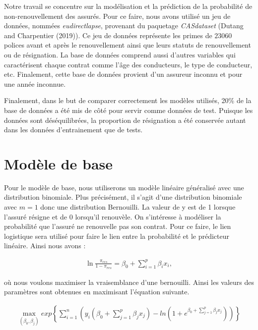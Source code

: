 \documentclass[]{article}
\begin{document}
Notre travail se concentre sur la modélisation et la prédiction de la
probabilité de non-renouvellement des assurés. Pour ce faire, nous avons
utilisé un jeu de données, nommées \emph{eudirectlapse}, provenant du
paquetage \emph{CASdataset} (Dutang and Charpentier (2019)). Ce jeu de
données représente les primes de \(23 060\) polices avant et après le
renouvellement ainsi que leurs statuts de renouvellement ou de
résignation. La base de données comprend aussi d'autres variables qui
caractérisent chaque contrat comme l'âge des conducteurs, le type de
conducteur, etc. Finalement, cette base de données provient d'un
assureur inconnu et pour une année inconnue.

Finalement, dans le but de comparer correctement les modèles utilisés,
20\% de la base de données a été mis de côté pour servir comme données
de test. Puisque les données sont déséquilibrées, la proportion de
résignation a été conservée autant dans les données d'entrainement que
de tests.

\newpage

\section{Modèle de base}\label{moduxe8le-de-base}

Pour le modèle de base, nous utiliserons un modèle linéaire généralisé
avec une distribution binomiale. Plus précisément, il s'agit d'une
distribution binomiale avec \(m = 1\) donc une distribution Bernouilli.
La valeur de y est de 1 lorsque l'assuré résigne et de 0 lorsqu'il
renouvèle. On s'intéresse à modéliser la probabilité que l'assuré ne
renouvelle pas son contrat. Pour ce faire, le lien logistique sera
utilisé pour faire le lien entre la probabilité et le prédicteur
linéaire. Ainsi nous avons :

\begin{align}
    \ln \frac{\pi_{res}}{1 - \pi_{res}} = \beta_0 + \sum_{i=1}^p \beta_i x_i,
\end{align}

où nous voulons maximiser la vraisemblance d'une bernouilli. Ainsi les
valeurs des paramètres sont obtenues en maximisant l'équation suivante.

\begin{align}
    \max\limits_{(\beta_0, \beta_j)} exp\left\{ \sum_{i=1}^n \left( y_{i} (\beta_{0} + \sum_{j=1}^p \beta_{j} x_{j} ) - ln \left(1 + e^{\beta_{0} + \sum\limits_{j=1}^p \beta_{j} x_{j}} \right)\right) \right\}
\end{align}
\end{document}
